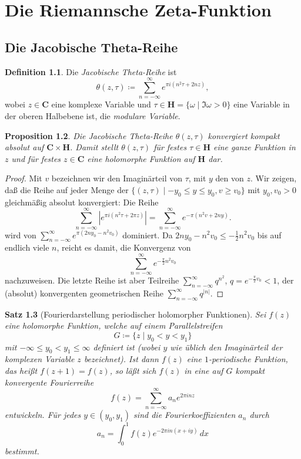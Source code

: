 \documentclass[a4paper,twoside,openright]{report}
\newtheorem{thm}{Satz}[chapter]
\newtheorem{prop}[thm]{Proposition}
\theoremstyle{definition}
\newtheorem{dfn}[thm]{Definition}
\theoremstyle{remark}
\begin{document}
\chapter{Die Riemannsche Zeta-Funktion}

\section{Die Jacobische Theta-Reihe}

\begin{dfn}
  Die \emph{Jacobische Theta-Reihe} ist
  \[
    \theta(z, \tau) \coloneqq \sum_{n = -\infty}^\infty e^{\pi i (n^2 \tau + 2 n z)},
  \]
  wobei $z \in \mathbf C$ eine komplexe Variable und $\tau \in \mathbf H = \{\omega \mid \Im \omega > 0\}$ eine
  Variable in der oberen Halbebene ist, die \emph{modulare Variable}.
\end{dfn}

\begin{prop}
  Die Jacobische Theta-Reihe $\theta(z, \tau)$ konvergiert kompakt absolut auf
  $\mathbf C \times \mathbf H$. Damit stellt $\theta(z, \tau)$ für festes
  $\tau \in \mathbf H$ eine ganze Funktion in $z$ und für festes $z \in \mathbf C$
  eine holomorphe Funktion auf $\mathbf H$ dar.
\end{prop}

\begin{proof}
  Mit $v$ bezeichnen wir den Imaginärteil von $\tau$, mit $y$ den von $z$. Wir
  zeigen, daß die Reihe auf jeder Menge der $\{(z, \tau) \mid -y_0 \leq y \leq y_0,
  v \ge v_0\}$ mit $y_0, v_0 > 0$ gleichmäßig
  absolut konvergiert: Die Reihe
  \[
    \sum_{n = -\infty}^\infty |e^{\pi i (n^2 \tau + 2 \pi z)}|
    = \sum_{n = -\infty}^\infty e^{-\pi (n^2 v + 2 n y)}.
  \]
  wird von $\sum_{n = -\infty}^\infty e^{\pi (2 n y_0 - n^2 v_0)}$ dominiert.
  Da $2 n y_0 - n^2 v_0 \leq - \frac 1 2 n^2 v_0$ bis auf endlich viele $n$,
  reicht es damit, die Konvergenz von
  \[
    \sum_{n = -\infty}^\infty e^{- \frac \pi 2 n^2 v_0}   
  \]
  nachzuweisen. Die letzte Reihe ist aber Teilreihe $\sum_{n = -\infty}^\infty
  q^{n^2}$, $q = e^{-\frac \pi 2 v_0} < 1$, der (absolut) konvergenten geometrischen
  Reihe $\sum_{n = -\infty}^\infty q^{|n|}$.
\end{proof}

\begin{thm}[Fourierdarstellung periodischer holomorpher Funktionen]
  Sei $f(z)$ eine holomorphe Funktion, welche auf einem \emph{Parallelstreifen}
  \[
    G \coloneqq \{z \mid y_0 < y < y_1\}
  \]
  mit $-\infty \leq y_0 < y_1 \leq \infty$ definiert ist (wobei $y$ wie üblich
  den Imaginärteil der komplexen Variable $z$ bezeichnet). Ist dann $f(z)$ eine $1$-periodische
  Funktion, das heißt $f(z + 1) = f(z)$, so läßt sich $f(z)$ in eine auf $G$ kompakt
  konvergente \emph{Fourierreihe}
  \[
    f(z) = \sum_{n = -\infty}^\infty a_n e^{2 \pi i n z}
  \]
  entwickeln. Für jedes $y \in (y_0, y_1)$ sind die
  \emph{Fourierkoeffizienten} $a_n$ durch
  \[
    a_n = \int_0^1 f(z) e^{- 2 \pi i n (x + i y)} \, dx
  \]
  bestimmt.
\end{thm}
\end{document}
